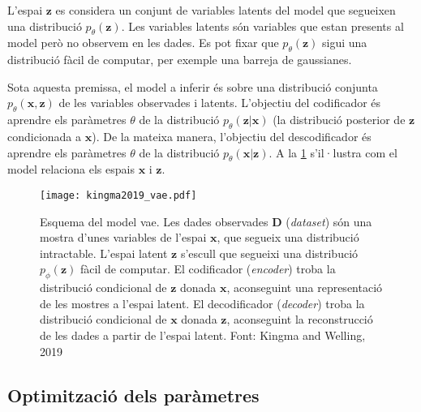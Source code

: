 \documentclass[CAT,BIB]{TFUOC}%
\begin{document}
        L'espai $\mathbf{z}$ es considera un conjunt de variables latents del model
        que segueixen una distribució $p_\theta(\mathbf{z})$.
        Les variables latents són variables que estan presents al model però no observem en les dades.
        Es pot fixar que $p_\theta(\mathbf{z})$ sigui una distribució fàcil de computar,
        per exemple una barreja de gaussianes.

        Sota aquesta premissa,
        el model a inferir és sobre una distribució conjunta $p_\theta(\mathbf{x,z})$
        de les variables observades i latents.
        L'objectiu del codificador és aprendre els paràmetres $\theta$
        de la distribució $p_\theta(\mathbf{z|x})$
        (la distribució posterior de $\mathbf{z}$ condicionada a $\mathbf{x}$).
        De la mateixa manera,
        l'objectiu del descodificador és aprendre els paràmetres $\theta$
        de la distribució $p_\theta(\mathbf{x|z})$.
        A la \cref{f:vae_kingma} s'il·lustra
        com el model relaciona els espais $\mathbf{x}$ i $\mathbf{z}$.

        \begin{figure}
            \centering
            \texttt{[image: kingma2019\_vae.pdf]}
            \caption[\textit{Variational autoencoder}: model probabilístic]{
                Esquema del model \gls{vae}.
                Les dades observades $\mathbf{D}$ (\textit{dataset})
                són una mostra d'unes variables de l'espai $\mathbf{x}$,
                que segueix una distribució intractable.
                L'espai latent $\mathbf{z}$ s'escull que segueixi
                una distribució $p_\phi(\mathbf{z})$ fàcil de computar.
                El codificador (\textit{encoder})
                troba la distribució condicional de $\mathbf{z}$ donada $\mathbf{x}$,
                aconseguint una representació de les mostres a l'espai latent.
                El decodificador (\textit{decoder})
                troba la distribució condicional de $\mathbf{x}$ donada $\mathbf{z}$,
                aconseguint la reconstrucció de les dades a partir de l'espai latent.
                Font: Kingma and Welling, 2019 \citep{Kingma2019}
            }
            \label{f:vae_kingma}
        \end{figure}

    \subsection{Optimització dels paràmetres}
    \label{s:vae_optimitzacio}
\end{document}
